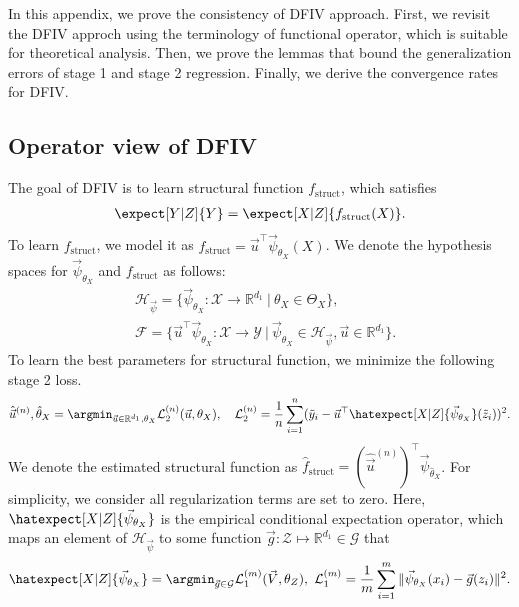 In this appendix, we prove the consistency of DFIV approach. First, we revisit the DFIV approch using the terminology of functional operator, which is suitable for theoretical analysis. Then, we prove the lemmas that bound the generalization errors of stage 1 and stage 2 regression. Finally, we derive the convergence rates for DFIV.

\subsection{Operator view of DFIV}

The goal of DFIV is to learn structural function $f_\mathrm{struct}$, which satisfies
\begin{align}
    \expect[Y|Z]{Y} = \expect[X|Z]{f_\mathrm{struct}(X)}. \label{eq:functional}
\end{align}
To learn $f_\mathrm{struct}$, we model it as $f_\mathrm{struct} = \vec{u}^\top \vec{\psi}_{\theta_X}(X)$. We denote the hypothesis spaces for $\vec{\psi}_{\theta_X}$ and $f_\mathrm{struct}$ as follows:
\begin{align*}
    &\mathcal{H}_{\vec{\psi}} = \{\vec{\psi}_{\theta_X}: \mathcal{X} \to \mathbb{R}^{d_1}~|~ \theta_X \in \Theta_X\},\\
    &\mathcal{F} = \{\vec{u}^\top \vec{\psi}_{\theta_X}: \mathcal{X} \to \mathcal{Y}~|~\vec{\psi}_{\theta_X} \in \mathcal{H}_{\vec{\psi}}, \vec{u} \in \mathbb{R}^{d_1}\}.
\end{align*} 
To learn the best parameters for structural function, we minimize the following stage 2 loss.
\begin{align*}
    \hat{\vec{u}}^{(n)}, \hat{\theta}_X = \argmin_{\vec{u} \in \mathbb{R}^{d_1}, \theta_X}\mathcal{L}^{(n)}_2(\vec{u},\theta_X), \quad \mathcal{L}^{(n)}_2 = \frac1n \sum_{i=1}^n (\tilde y_i - \vec{u}^\top \hatexpect[X|Z]{\vec{\psi}_{\theta_X}}(\tilde z_i))^2.
\end{align*}
We denote the estimated structural function as $\hat{f}_{\mathrm{struct}} = (\hat{\vec{u}}^{(n)})^\top \vec{\psi}_{\hat{\theta}_X}$. For simplicity, we consider all regularization terms are set to zero. Here, $\hatexpect[X|Z]{\vec{\psi}_{\theta_X}}$ is the empirical conditional expectation operator, which maps an element of $\mathcal{H}_{\vec{\psi}}$ to some function $\vec{g}: \mathcal{Z} \mapsto \mathbb{R}^{d_1} \in \mathcal{G}$ that
\begin{align*}
    \hatexpect[X|Z]{\vec{\psi}_{\theta_X}} = \argmin_{\vec{g} \in \mathcal{G}} \mathcal{L}_1^{(m)}(\vec{V}, \theta_Z),~ \mathcal{L}_1^{(m)} = \frac1m \sum_{i=1}^m \|\vec{\psi}_{\theta_X}(x_i) - \vec{g}(z_i)\|^2. 
\end{align*}
